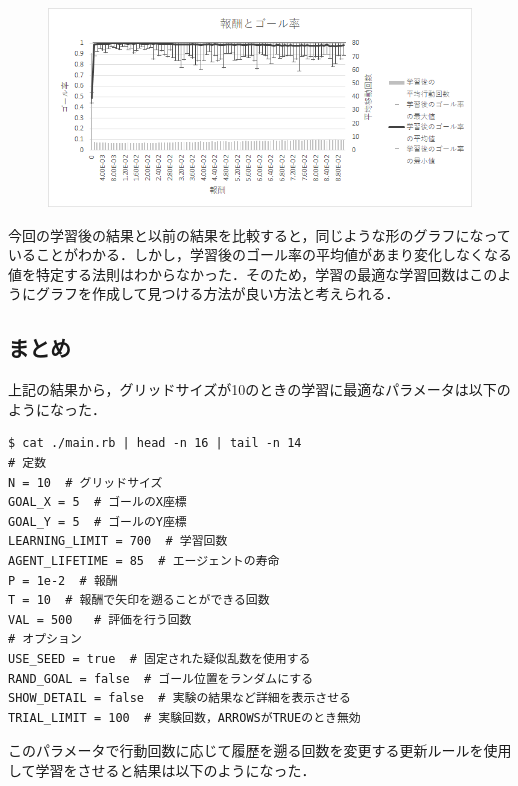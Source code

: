 \documentclass[a4j,11pt]{jarticle}
\begin{document}
\begin{figure}[ht]
  \begin{center}
    \includegraphics[scale=1.5]{img/valP10.png}
  \end{center}
\end{figure}

今回の学習後の結果と以前の結果を比較すると，同じような形のグラフになっていることがわかる．しかし，学習後のゴール率の平均値があまり変化しなくなる値を特定する法則はわからなかった．そのため，学習の最適な学習回数はこのようにグラフを作成して見つける方法が良い方法と考えられる．

\newpage

\subsection{まとめ}

上記の結果から，グリッドサイズが10のときの学習に最適なパラメータは以下のようになった．

\begin{verbatim}
$ cat ./main.rb | head -n 16 | tail -n 14
# 定数
N = 10  # グリッドサイズ
GOAL_X = 5  # ゴールのX座標
GOAL_Y = 5  # ゴールのY座標
LEARNING_LIMIT = 700  # 学習回数
AGENT_LIFETIME = 85  # エージェントの寿命
P = 1e-2  # 報酬
T = 10  # 報酬で矢印を遡ることができる回数
VAL = 500   # 評価を行う回数
# オプション
USE_SEED = true  # 固定された疑似乱数を使用する
RAND_GOAL = false  # ゴール位置をランダムにする
SHOW_DETAIL = false  # 実験の結果など詳細を表示させる
TRIAL_LIMIT = 100  # 実験回数，ARROWSがTRUEのとき無効
\end{verbatim}

このパラメータで行動回数に応じて履歴を遡る回数を変更する更新ルールを使用して学習をさせると結果は以下のようになった．
\end{document}
